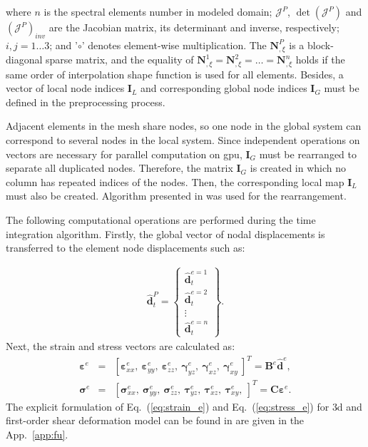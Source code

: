 %
where $n$ is the spectral elements number in modeled domain; \(\mathcal{J}^P\), \(\det\left(\mathcal{J}^P\right)\) and \(\left(\mathcal{J}^P\right)_{inv}\) are the Jacobian matrix, its determinant and inverse, respectively; $i,j=1\ldots3$; and '$\circ$' denotes element-wise multiplication.
The $\textbf{N}^P_{,\xi}$ is a block-diagonal sparse matrix, and the equality of $\textbf{N}^1_{,\xi}=\textbf{N}^2_{,\xi}=\ldots=\textbf{N}^n_{,\xi}$ holds if the same order of interpolation shape function is used for all elements.
Besides, a vector of local node indices $\textbf{I}_L$ and corresponding global node indices $\textbf{I}_G$ must be defined in the preprocessing process.

Adjacent elements in the mesh share nodes, so one node in the global system can correspond to several nodes in the local system.
Since independent operations on vectors are necessary for parallel computation on \ac{gpu}, $\textbf{I}_G$ must be rearranged to separate all duplicated nodes.
Therefore, the matrix $\textbf{I}_G$ is created in which no column has repeated indices of the nodes.
Then, the corresponding local map $\textbf{I}_L$ must also be created.
Algorithm presented in \cite{kudela2016parallel} was used for the rearrangement.

The following computational operations are performed during the time integration algorithm. Firstly, the global vector of nodal displacements is transferred to the element node displacements such as:

\begin{eqnarray}
	\widehat{\textbf{d}}_t^P = \left\{ \begin{array}{c}
		\widehat{\textbf{d}}_t^{e=1}\\
		\widehat{\textbf{d}}_t^{e=2}\\
		\vdots\\
		\widehat{\textbf{d}}_t^{e=n} \end{array}\right\}.
\end{eqnarray}
Next, the strain and stress vectors are calculated as:
\begin{eqnarray}
	\label{eq:strain_e}
	\boldsymbol{\varepsilon}^e & = & \left[\boldsymbol{\varepsilon}^e_{xx},\ \boldsymbol{\varepsilon}^e_{yy},\ \boldsymbol{\varepsilon}^e_{zz},\ \boldsymbol{\gamma}^e_{yz},\ \boldsymbol{\gamma}^e_{xz},\ \boldsymbol{\gamma}^e_{xy}\ \right]^T=\textbf{B}^e\widehat{\textbf{d}}^e,\\
	\label{eq:stress_e}
	\boldsymbol{\sigma}^e & = & \left[\boldsymbol{\sigma}^e_{xx},\ \boldsymbol{\sigma}^e_{yy},\ \boldsymbol{\sigma}^e_{zz},\ \boldsymbol{\tau}^e_{yz},\ \boldsymbol{\tau}^e_{xz},\ \boldsymbol{\tau}^e_{xy},\ \right]^T=\textbf{C}\boldsymbol{\varepsilon}^e.
\end{eqnarray}
The explicit formulation of Eq.~(\ref{eq:strain_e}) and Eq.~(\ref{eq:stress_e}) for \ac{3d} and first-order shear deformation model can be found in are given in the App.~\ref{app:fu}.

